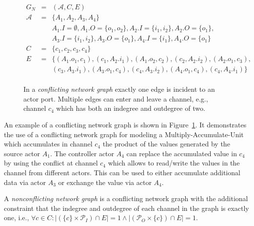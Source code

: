 \begin{figure}
\centering

\begin{displaymath}
\begin{array}{rcl}
  G_N & = & (\mathcal{A},C,E) \\
  \mathcal{A} & = & \{A_1,A_2,A_3,A_4\} \\
      &   & A_1.I = \emptyset, A_1.O=\{o_1,o_2\}, A_2.I = \{i_1,i_2\}, A_2.O=\{o_1\},\\
      &   & A_3.I = \{i_1,i_2\}, A_3.O=\{o_1\},A_4.I = \{i_1\}, A_4.O=\{o_1\}\\
  C   & = & \{c_1,c_2,c_3,c_4\} \\
  E   & = & \{(A_1.o_1,c_1),(c_1,A_2.i_1),(A_1.o_2,c_2),(c_2,A_2.i_2),(A_2.o_1,c_3),\\
      &   &   (c_3,A_3.i_1),(A_3.o_1,c_4),(c_4,A_3.i_2),(A_4.o_1,c_4),(c_4,A_4.i_1)\}\\
\end{array}
\end{displaymath}
\caption{\label{fig:ng-conflicting}In a \emph{conflicting network graph} exactly
  one edge is incident to an actor port. Multiple edges can
  enter and leave a channel, e.g., channel $c_4$
  which has both an indegree and outdegree of two.}
\end{figure}

  An example of a conflicting network graph is shown in Figure~\ref{fig:ng-conflicting}.
  It demonstrates the use of a conflicting network graph for modeling
  a Multiply-Accumulate-Unit which accumulates in channel $c_4$ the
  product of the values generated by the source actor $A_1$.
  The controller actor $A_4$ can replace the
  accumulated value in $c_4$ by using the conflict at channel $c_4$ which
  allows to read/write the values in the channel from different actors.
  This can be used to either accumulate additional data via actor $A_3$
  or exchange the value via actor $A_4$.

\begin{definition}\label{noconflicting-network-graph}
  A \emph{nonconflicting network graph} is a conflicting network graph with the
  additional constraint that the indegree and outdegree of each channel in
  the graph is exactly one, i.e.,
  $\forall{c \in C}: |(\{c\} \times \mathcal{P}_I) \cap E| = 1 \wedge
                     |(\mathcal{P}_O \times \{c\}) \cap E| = 1$.
\end{definition}


